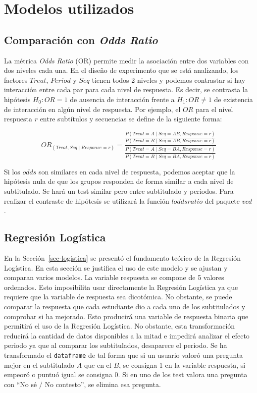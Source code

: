 \documentclass[
  12pt,
  a4paper,
  extrafontsizes,
  onecolumn,
  openright,
  table]{memoir}
\begin{document}
\hypertarget{sec-modelos-utilizados}{%
\section{Modelos utilizados}\label{sec-modelos-utilizados}}

\hypertarget{sec-or-2}{%
\subsection{\texorpdfstring{Comparación con \emph{Odds
Ratio}}{Comparación con Odds Ratio}}\label{sec-or-2}}

La métrica \emph{Odds Ratio} (OR) permite medir la asociación entre dos
variables con dos niveles cada una. En el diseño de experimento que se
está analizando, los factores \(Treat\), \(Period\) y \(Seq\) tienen
todos 2 niveles y podemos contrastar si hay interacción entre cada par
para cada nivel de respuesta. Es decir, se contrasta la hipótesis
\(H_0: OR=1\) de ausencia de interacción frente a \(H_1: OR \neq 1\) de
existencia de interacción en algún nivel de respuesta. Por ejemplo, el
\(OR\) para el nivel respuesta \(r\) entre subtítulos y secuencias se
define de la siguiente forma:

\[
OR_{(Treat, Seq \mid Response=r)}=\frac{
    \frac{
            P(Treat=A \mid Seq=AB, Response=r)
        }{
            P(Treat=B \mid Seq=AB, Response=r)
        }
    }
    {\frac{
        P(Treat=A \mid Seq=BA, Response=r)
        }{
        P(Treat=B \mid Seq=BA, Response=r)
    }
}
\]

Si los \(odds\) son similares en cada nivel de respuesta, podemos
aceptar que la hipótesis nula de que los grupos responden de forma
similar a cada nivel de subtitulado. Se hará un test similar pero entre
subtitulado y periodos. Para realizar el contraste de hipótesis se
utilizará la función \(loddsratio\) del paquete \(vcd\).

\hypertarget{sec-logistica-2}{%
\subsection{Regresión Logística}\label{sec-logistica-2}}

En la Sección~\ref{sec-logistica} se presentó el fundamento teórico de
la Regresión Logística. En esta sección se justifica el uso de este
modelo y se ajustan y comparan varios modelos. La variable respuesta se
compone de 5 valores ordenados. Esto imposibilita usar directamente la
Regresión Logística ya que requiere que la variable de respuesta sea
dicotómica. No obstante, se puede comparar la respuesta que cada
estudiante dio a cada uno de los subtitulados y comprobar si ha
mejorado. Esto producirá una variable de respuesta binaria que permitirá
el uso de la Regresión Logística. No obstante, esta transformación
reducirá la cantidad de datos disponibles a la mitad e impedirá analizar
el efecto periodo ya que al comparar los subtitulados, desaparece el
periodo. Se ha transformado el \texttt{dataframe} de tal forma que si un
usuario valoró una pregunta mejor en el subtitulado \(A\) que en el
\(B\), se consigna 1 en la variable respuesta, si empeoró o puntuó igual
se consigna 0. Si en uno de los test valora una pregunta con \enquote{No
sé / No contesto}, se elimina esa pregunta.
\end{document}
